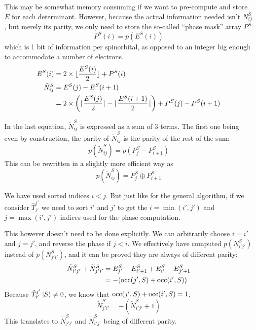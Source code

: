 \documentclass[./thesis.tex]{subfiles}
\begin{document}
This may be somewhat memory consuming if we want to pre-compute and store $E$ for each determinant. However, because the actual information needed isn't $N^S_{ij}$, but merely its parity, we only need to store the so-called ``phase mask'' array $P^S$
\begin{equation}
\label{eq:phasemask}
P^S(i) = p(E^S(i))
\end{equation}
which is 1 bit of information per spinorbital, as opposed to an integer big enough to accommodate a number of electrons.
\begin{align}
E^S(i) & = 2 \times  \lfloor \frac{E^S(i)}{2} \rfloor + P^S(i) \\
\tilde N^S_{ij} & = E^S(j) - E^S(i+1) \\
 & = 2 \times \qty( \lfloor \frac{E^S(j)}{2} \rfloor - \lfloor \frac{E^S(i+1)}{2} \rfloor ) + P^S(j) - P^S(i+1)
\end{align}
	    
In the last equation, $\tilde N^S_{ij}$ is expressed as a sum of 3 terms. The first one being even by construction, the parity of $\tilde N^S_{ij}$ is the parity of the rest of the sum:
\begin{equation}
p(\tilde N^S_{ij})=p(P^S_j - P^S_{i+1})
\end{equation}
This can be rewritten in a slightly more efficient way as
\begin{equation}
p(\tilde N^S_{ij}) = P^S_j \oplus P^S_{i+1}
\end{equation}


We have used sorted indices $i<j$. But just like for the general algorithm, if we consider $\hat T_{i'}^{j'}$ we need to sort $i'$ and $j'$ to get the $i=\min(i', j')$ and $j=\max(i', j')$ indices used for the phase computation.

This however doesn't need to be done explicitly. We can arbitrarily choose $i=i'$ and $j=j'$, and reverse the phase if $j<i$. We effectively have computed $p(N^S_{i'j'})$ instead of $p(N^S_{j'i'})$, and it can be proved they are always of different parity:
\begin{align}
\tilde N^{S}_{i' j'} + \tilde N^{S}_{j'i'} & = E^{S}_{j'} - E^S_{i'+1} + E^S_{i'} - E^S_{j'+1} \\
& = -\qty( {\text{occ}(j',S)} + {\text{occ}(i',S)})
\end{align}
Because $\hat T_{i'}^{j'} \ket S \neq 0$, we know that ${\text{occ}(j',S)} + {\text{occ}(i',S)} = 1$. 
\begin{equation}
\tilde N^{S}_{j' i'} = -(\tilde N^{S}_{i'j'} + 1)
\end{equation}
This translates to $\tilde N^{S}_{j' i'}$ and $\tilde N^{S}_{i'j'}$ being of different parity.
\end{document}
